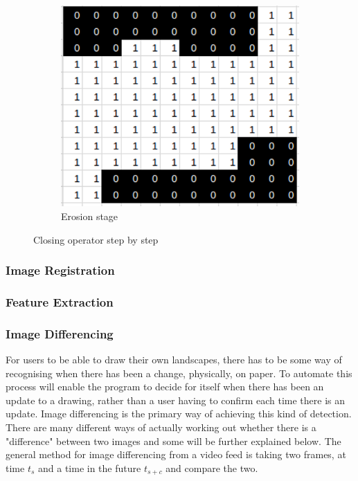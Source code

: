 \documentclass[11pt]{report}
\begin{document}
\begin{figure}
\begin{subfigure}{.32\textwidth}
		\centering
		\includegraphics[scale=0.27]{pics/closing_e}
		\caption{Erosion stage}
	\end{subfigure}
	\caption{Closing operator step by step}
	\label{fig:closing}
\end{figure}



\subsubsection*{Image Registration}
\subsubsection*{Feature Extraction}

\subsubsection*{Image Differencing}
For users to be able to draw their own landscapes, there has to be some way
of recognising when there has been a change, physically, on paper. To 
automate this process will enable the program to decide for itself when
there has been an update to a drawing, rather than a user having to confirm each
time there is an update. Image differencing is the primary way of 
achieving this kind of detection. There are many different ways of actually
working out whether there is a "difference" between two images and some will
be further explained below. The general method for image differencing from
a video feed is taking two frames, at time $t_s$ and a time in the future
$t_{s+c}$ and compare the two.
\end{document}
